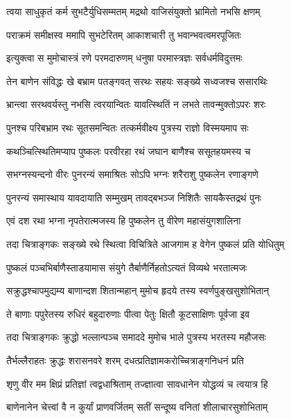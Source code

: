 
\twolineshloka
{त्वया साधुकृतं कर्म सुभटैर्युधिसम्मतम्}
{मद्रथो वाजिसंयुक्तो भ्रामितो नभसि क्षणम्}%

\twolineshloka
{पराक्रमं समीक्षस्व ममापि सुभटेरितम्}
{आकाशचारी तु भवान्भवत्वमरपूजितः}%

\twolineshloka
{इत्युक्त्वा स मुमोचास्त्रं रणे परमदारुणम्}
{धनुषा परमास्त्रज्ञः सर्वधर्मविदुत्तमः}%

\twolineshloka
{तेन बाणेन संविद्धः खे बभ्राम पतङ्गवत्}
{सरथः सहयः सङ्ख्ये सध्वजश्च ससारथिः}%

\twolineshloka
{भ्रान्त्वा सरथवर्यस्तु नभसि त्वरयान्वितः}
{यावत्स्थितिं न लभते तावन्मुक्तोऽपरः शरः}%

\twolineshloka
{पुनश्च परिबभ्राम रथः सूतसमन्वितः}
{तत्कर्मवीक्ष्य पुत्रस्य राज्ञो विस्मयमाप सः}%

\twolineshloka
{कथञ्चित्स्थितिमप्याप पुष्कलः परवीरहा}
{रथं जघान बाणैश्च ससूतहयमस्य च}%

\twolineshloka
{सभग्नस्यन्दनो वीरः पुनरन्यं समाश्रितः}
{सोऽपि भग्नः शरैराशु पुष्कलेन रणाङ्गणे}%

\twolineshloka
{पुनरन्यं समास्थाय यावदायाति सम्मुखम्}
{तावद्बभञ्ज निशितैः सायकैस्तद्रथं पुनः}%

\twolineshloka
{एवं दश रथा भग्ना नृपतेरात्मजस्य हि}
{पुष्कलेन तु वीरेण महासंयुगशालिना}%

\twolineshloka
{तदा चित्राङ्गकः सङ्ख्ये रथे स्थित्वा विचित्रिते}
{आजगाम ह वेगेन पुष्कलं प्रति योधितुम्}%

\twolineshloka
{पुष्कलं पञ्चभिर्बाणैस्ताडयामास संयुगे}
{तैर्बाणैर्निहतोऽत्यतं विव्यथे भरतात्मजः}%

\twolineshloka
{सक्रुद्धश्चापमुद्यम्य बाणान्दश शितान्महान्}
{मुमोच हृदये तस्य स्वर्णपुङ्खसुशोभितान्}%

\twolineshloka
{ते बाणाः पपुरेतस्य रुधिरं बहुदारुणाः}
{पीत्वा पेतुः क्षितौ कूटसाक्षिणः पूर्वजा इव}%

\twolineshloka
{तदा चित्राङ्गकः क्रुद्धो भल्लान्पञ्च समाददे}
{मुमोच भाले पुत्रस्य भरतस्य महौजसः}%

\twolineshloka
{तैर्भल्लैराहतः क्रुद्धः शरासनवरे शरम्}
{दधत्प्रतिज्ञामकरोच्चित्राङ्गनिधनं प्रति}%

\twolineshloka
{शृणु वीर मम क्षिप्रं प्रतिज्ञां त्वद्वधाश्रिताम्}
{तज्ज्ञात्वा सावधानेन योद्धव्यं च त्वयात्र हि}%

\twolineshloka
{बाणेनानेन चेत्त्वां वै न कुर्यां प्राणवर्जितम्}
{सतीं सन्दूष्य वनितां शीलाचारसुशोभिताम्}%


